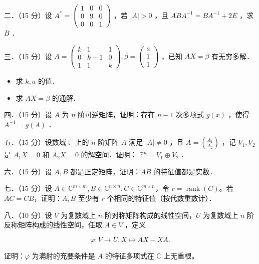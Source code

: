\documentclass{article}
\begin{document}
二．（15 分）设 \(A^{*}=\left(\begin{array}{lll}1 & 0 & 0 \\ 0 & 9 & 0 \\ 0 & 0 & 1\end{array}\right)\) ，若 \(|A|>0\) ，且 \(A B A^{-1}=B A^{-1}+2 E\) ，求 \(B\) ．

三．（15 分）设 \(A=\left(\begin{array}{ccc}k & 1 & 1 \\ 0 & k-1 & 0 \\ 1 & 1 & k\end{array}\right), \beta=\left(\begin{array}{l}a \\ 1 \\ 1\end{array}\right)\) ，已知 \(A X=\beta\) 有无穷多解．

\begin{itemize}
  \item[（1）] 求 \(k, a\) 的值．
  \item[（2）] 求 \(A X=\beta\) 的通解．
\end{itemize}

四．（15 分）设 \(A\) 为 \(n\) 阶可逆矩阵，证明：存在 \(n-1\) 次多项式 \(g(x)\) ，使得 \(A^{-1}=g(A)\) ．

五．（15 分）设数域 \(\mathbb{F}\) 上的 \(n\) 阶矩阵 \(A\) 满足 \(|A| \neq 0\) ，且 \(A=\binom{A_{1}}{A_{2}}\) ，记 \(V_{1}, V_{2}\) 是 \(A_{1} X=0\) 和 \(A_{2} X=0\) 的解空间．证明： \(\mathbb{F}^{n}=V_{1} \oplus V_{2}\) ．

六．（15 分）设 \(A, B\) 都是正定矩阵，证明：\(A B\) 的特征值都是实数．

七．（15 分）设 \(A\in\mathbb{C}^{m\times m}, B\in\mathbb{C}^{n\times n}, C\in\mathbb{C}^{m\times n}\)，令 \(r=\operatorname{rank}(C)\)。若 \(AC=CB\)，证明：\(A,B\) 至少有 \(r\) 个相同的特征值（按代数重数计）．

八．（10 分）设 \(V\) 为复数域上 \(n\) 阶对称矩阵构成的线性空间，\(U\) 为复数域上 \(n\) 阶反称矩阵构成的线性空间，任取 \(A \in V\) ，定义

\[
\varphi: V \rightarrow U, X \mapsto A X-X A .
\]

证明：\(\varphi\) 为满射的充要条件是 \(A\) 的特征多项式在 \(\mathbb{C}\) 上无重根。
\end{document}
